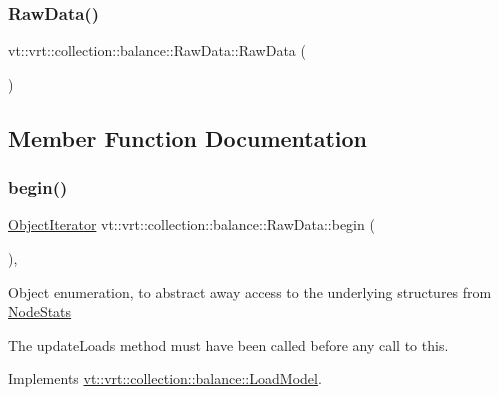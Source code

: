 \subsubsection{\texorpdfstring{Raw\+Data()}{RawData()}}
{\footnotesize\ttfamily vt\+::vrt\+::collection\+::balance\+::\+Raw\+Data\+::\+Raw\+Data (\begin{DoxyParamCaption}{ }\end{DoxyParamCaption})\hspace{0.3cm}{\ttfamily [default]}}



\subsection{Member Function Documentation}
\mbox{\label{structvt_1_1vrt_1_1collection_1_1balance_1_1_raw_data_a54351249212ade8b2d25a857e71b256f}} 
\subsubsection{\texorpdfstring{begin()}{begin()}}
{\footnotesize\ttfamily \hyperlink{classvt_1_1vrt_1_1collection_1_1balance_1_1_object_iterator}{Object\+Iterator} vt\+::vrt\+::collection\+::balance\+::\+Raw\+Data\+::begin (\begin{DoxyParamCaption}{ }\end{DoxyParamCaption})\hspace{0.3cm}{\ttfamily [override]}, {\ttfamily [virtual]}}

Object enumeration, to abstract away access to the underlying structures from \hyperlink{structvt_1_1vrt_1_1collection_1_1balance_1_1_node_stats}{Node\+Stats}

The {\ttfamily update\+Loads} method must have been called before any call to this. 

Implements \hyperlink{classvt_1_1vrt_1_1collection_1_1balance_1_1_load_model_a6ca139b4f14d79d1d59b46016efae221}{vt\+::vrt\+::collection\+::balance\+::\+Load\+Model}.

\mbox{\label{structvt_1_1vrt_1_1collection_1_1balance_1_1_raw_data_a07ae6234d91c2daa7c2d51117b224f7d}} 
